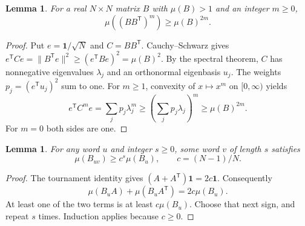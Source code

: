 \documentclass[11pt]{article}
\newtheorem{lemma}[theorem]{Lemma}
\begin{document}
\begin{lemma}\label{lem:amplification}
For a real $N\times N$ matrix $B$ with $\mu(B)>1$ and an integer $m\geq0$,
\[
 \mu((BB^{\mathsf T})^m)\geq \mu(B)^{2m}.
\]
\end{lemma}
\begin{proof}
Put $e=\mathbf1/\sqrt N$ and $C=BB^{\mathsf T}$. Cauchy--Schwarz gives
$e^{\mathsf T}Ce=\|B^{\mathsf T}e\|^2\geq(e^{\mathsf T}Be)^2=\mu(B)^2$.
By the spectral theorem, $C$ has nonnegative eigenvalues $\lambda_j$ and an
orthonormal eigenbasis $u_j$. The weights $p_j=(e^{\mathsf T}u_j)^2$ sum to one.
For $m\geq1$, convexity of $x\mapsto x^m$ on $[0,\infty)$ yields
\[
 e^{\mathsf T}C^me=\sum_jp_j\lambda_j^m
 \geq\left(\sum_jp_j\lambda_j\right)^m
 \geq\mu(B)^{2m}.
\]
For $m=0$ both sides are one.
\end{proof}

\begin{lemma}\label{lem:padding}
For any word $u$ and integer $s\geq0$, some word $v$ of length $s$ satisfies
\[
 \mu(B_{uv})\geq c^s\mu(B_u),\qquad c=(N-1)/N.
\]
\end{lemma}
\begin{proof}
The tournament identity gives $(A+A^{\mathsf T})\mathbf1=2c\mathbf1$.
Consequently
\[
 \mu(B_uA)+\mu(B_uA^{\mathsf T})=2c\mu(B_u).
\]
At least one of the two terms is at least $c\mu(B_u)$.
Choose that next sign, and repeat $s$ times. Induction applies because $c\geq0$.
\end{proof}
\end{document}

